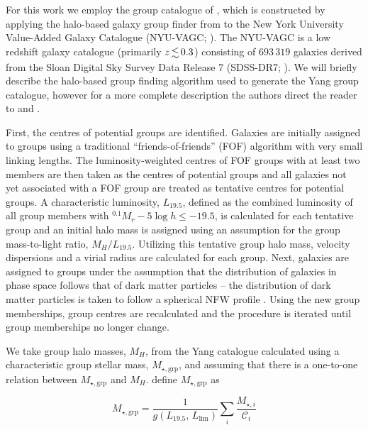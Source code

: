 \documentclass[a4paper,fleqn,usenatbib]{mnras}
\begin{document}
For this work we employ the group catalogue of \citet{yang2007}, which
is constructed by applying the halo-based galaxy group finder from
\citet{yang2005, yang2007} to the New York University Value-Added
Galaxy Catalogue (NYU-VAGC; \citealt{blanton2005}).  The NYU-VAGC is a
low redshift galaxy catalogue (primarily $z \la 0.3$) consisting of
$693\,319$ galaxies derived from the Sloan Digital Sky Survey Data Release
7 (SDSS-DR7; \citealt{abazajian2009}).  We will briefly describe the
halo-based group finding algorithm used to generate the Yang group catalogue,
however for a more complete description the authors direct the reader
to \citet{yang2005} and \citet{yang2007}.
\par
First, the centres of potential groups are identified.  Galaxies are
initially assigned to groups using a traditional
``friends-of-friends'' (FOF) algorithm \citep[e.g.][]{huchra1982} with
very small linking lengths.  The luminosity-weighted centres of
FOF groups with at least two members are then taken as the centres of
potential groups and all galaxies not yet associated with a FOF group
are treated as tentative centres for potential groups.  A
characteristic luminosity, $L_{19.5}$, defined as the combined
luminosity of all group members with $^{0.1}M_r - 5\log h \le -19.5$,
is calculated for each tentative group and an initial halo mass is
assigned using an assumption for the group mass-to-light ratio,
$M_H/L_{19.5}$.  Utilizing this tentative group halo mass, velocity
dispersions and a virial radius are calculated for each group.  Next,
galaxies are assigned to groups under the assumption that the
distribution of galaxies in phase space follows that of dark matter
particles -- the distribution of dark matter particles is taken to
follow a spherical NFW profile \citep{navarro1997}.  Using the new
group memberships, group centres are recalculated and the procedure is
iterated until group memberships no longer change.
\par
We take group halo masses, $M_H$, from the Yang catalogue calculated
using a characteristic group stellar mass, $M_{\star,\text{grp}}$, and
assuming that there is a one-to-one relation between $M_{\star,\text{grp}}$
and $M_H$.  \citet{yang2007} define $M_{\star,\text{grp}}$ as

\begin{equation}
  M_{\star,\text{grp}} = \frac{1}{g(L_{19.5},\,L_{\text{lim}})} \sum_i
  \frac{M_{\star,i}}{\mathcal{C}_i}
\end{equation}
\end{document}
